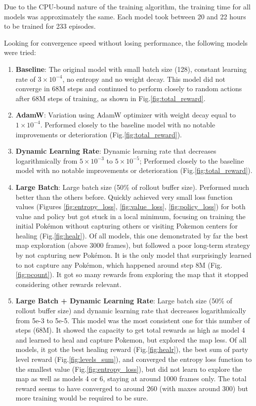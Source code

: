 \documentclass[10pt,conference]{IEEEtran}
\begin{document}
Due to the CPU-bound nature of the training algorithm, the training time for all models was approximately the same.  Each model took between 20 and 22 hours to be trained for 233 episodes.

Looking for convergence speed without losing performance, the following models were tried:

\begin{enumerate}
  \item \textbf{Baseline}: The original model with small batch size (128), constant learning rate of \(3 \times 10^{-4}\), no entropy and no weight decay.
  This model did not converge in 68M steps and continued to perform closely to random actions after 68M steps of training, as shown in Fig.\ref{fig:total_reward}.

  \item \textbf{AdamW}: Variation using AdamW optimizer with weight decay equal to \(1 \times 10^{-4}\).
  Performed closely to the baseline model with no notable improvements or deterioration (Fig.\ref{fig:total_reward}).

  \item \textbf{Dynamic Learning Rate}: Dynamic learning rate that decreases logarithmically from \(5 \times 10^{-3}\) to \(5 \times 10^{-5}\);
  Performed closely to the baseline model with no notable improvements or deterioration (Fig.\ref{fig:total_reward}).

  \item \textbf{Large Batch}: Large batch size (50\% of rollout buffer size).
  Performed much better than the others before. Quickly achieved very small loss function values (Figures \ref{fig:entropy_loss}, \ref{fig:value_loss}, \ref{fig:policy_loss}) for both value and policy but got stuck in a local minimum, focusing on training the initial Pokémon without capturing others or visiting Pokemon centers for healing (Fig.\ref{fig:healr}). Of all models, this one demonstrated by far the best map exploration (above 3000 frames), but followed a poor long-term strategy by not capturing new Pokémon. It is the only model that surprisingly learned to not capture any Pokémon, which happened around step 8M (Fig.\ref{fig:pcount}). It got so many rewards from exploring the map that it stopped considering other rewards relevant.

  \item \textbf{Large Batch + Dynamic Learning Rate}: Large batch size (50\% of rollout buffer size) and dynamic learning rate that decreases logarithmically from 5e-3 to 5e-5.
  This model was the most consistent one for this number of steps (68M). It showed the capacity to get total rewards as high as model 4 and learned to heal and capture Pokemon, but explored the map less. Of all models, it got the best healing reward (Fig.\ref{fig:healr}), the best sum of party level reward (Fig.\ref{fig:levels_sum}), and converged the entropy loss function to the smallest value (Fig.\ref{fig:entropy_loss}), but did not learn to explore the map as well as models 4 or 6, staying at around 1000 frames only. The total reward seems to have converged to around 260 (with maxes around 300) but more training would be required to be sure.


\end{enumerate}
\end{document}
